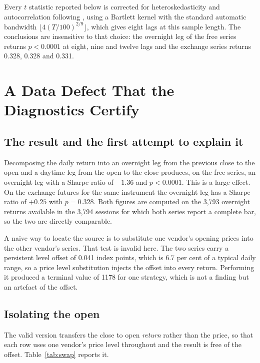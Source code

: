 \documentclass[10pt]{article}
\begin{document}
Every $t$ statistic reported below is corrected for heteroskedasticity and autocorrelation
following \citet{neweywest1987}, using a Bartlett kernel with the standard automatic
bandwidth $\lfloor 4(T/100)^{2/9}\rfloor$, which gives eight lags at this sample length.
The conclusions are insensitive to that choice: the overnight leg of the free series returns
$p<0.0001$ at eight, nine and twelve lags and the exchange series returns 0.328, 0.328 and
0.331.

\section{A Data Defect That the Diagnostics Certify}\label{sec:defect}

\subsection{The result and the first attempt to explain it}

Decomposing the daily return into an overnight leg from the previous close to the open and
a daytime leg from the open to the close produces, on the free series, an overnight leg
with a Sharpe ratio of $-1.36$ and $p<0.0001$. This is a large effect. On the exchange
futures for the same instrument the overnight leg has a Sharpe ratio of $+0.25$ with
$p=0.328$. Both figures are computed on the 3,793 overnight returns available in the 3,794
sessions for which both series report a complete bar, so the two are directly comparable.

A naive way to locate the source is to substitute one vendor's opening prices into the
other vendor's series. That test is invalid here. The two series carry a persistent level
offset of 0.041 index points, which is 6.7 per cent of a typical daily range, so a price
level substitution injects the offset into every return. Performing it produced a terminal
value of 1178 for one strategy, which is not a finding but an artefact of the offset.

\subsection{Isolating the open}

The valid version transfers the close to open \emph{return} rather than the price, so that
each row uses one vendor's price level throughout and the result is free of the offset.
Table~\ref{tab:swap} reports it.
\end{document}
